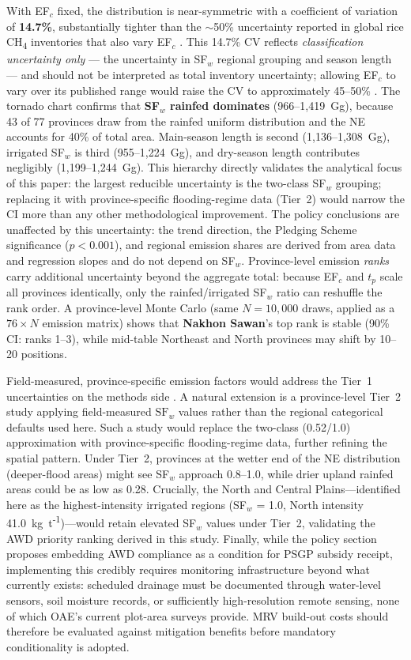 \documentclass[fleqn,10pt]{olplainarticle}
\begin{document}
With EF$_c$ fixed, the distribution is near-symmetric with a coefficient of
variation of \textbf{14.7\%}, substantially tighter than the $\sim$50\% uncertainty
reported in global rice CH\textsubscript{4} inventories that also vary EF$_c$
\citep{yan2009}.
This 14.7\% CV reflects \textit{classification uncertainty only} --- the uncertainty
in SF$_w$ regional grouping and season length --- and should not be interpreted as
total inventory uncertainty; allowing EF$_c$ to vary over its published range
would raise the CV to approximately 45--50\% \citep{yan2009}.
The tornado chart confirms that \textbf{SF$_w$ rainfed dominates}
(966--1,419~Gg), because 43 of 77 provinces draw from the rainfed
uniform distribution and the NE accounts for 40\% of total area.
Main-season length is second (1,136--1,308~Gg), irrigated SF$_w$ is third
(955--1,224~Gg), and dry-season length contributes negligibly (1,199--1,244~Gg).
This hierarchy directly validates the analytical focus of this paper:
the largest reducible uncertainty is the two-class SF$_w$ grouping; replacing it
with province-specific flooding-regime data (Tier~2) would narrow the CI more
than any other methodological improvement.
The policy conclusions are unaffected by this uncertainty: the trend direction,
the Pledging Scheme significance ($p < 0.001$), and regional emission shares
are derived from area data and regression slopes and do not depend on SF$_w$.
Province-level emission \textit{ranks} carry additional uncertainty beyond the
aggregate total: because EF$_c$ and $t_p$ scale all provinces identically, only
the rainfed/irrigated SF$_w$ ratio can reshuffle the rank order.
A province-level Monte Carlo (same $N = 10{,}000$ draws, applied as a $76 \times N$
emission matrix) shows that \textbf{Nakhon Sawan}'s top rank is stable (90\% CI:
ranks 1--3), while mid-table Northeast and North provinces may shift by 10--20
positions.

Field-measured, province-specific emission factors would address the Tier~1
uncertainties on the methods side \citep{wassmann2000, yan2009}.
A natural extension is a province-level Tier~2 study applying
field-measured $\text{SF}_w$ values rather than the regional categorical
defaults used here.
Such a study would replace the two-class (0.52/1.0) approximation with
province-specific flooding-regime data, further refining the spatial pattern.
Under Tier~2, provinces at the wetter end of the NE distribution (deeper-flood
areas) might see SF$_w$ approach 0.8--1.0, while drier upland rainfed areas
could be as low as 0.28.
Crucially, the North and Central Plains---identified here as the highest-intensity
irrigated regions (SF$_w$ = 1.0, North intensity 41.0~kg~t\textsuperscript{-1})---would
retain elevated SF$_w$ values under Tier~2, validating the AWD priority ranking
derived in this study.
Finally, while the policy section proposes embedding AWD compliance as a
condition for PSGP subsidy receipt, implementing this credibly requires
monitoring infrastructure beyond what currently exists: scheduled drainage
must be documented through water-level sensors, soil moisture records, or
sufficiently high-resolution remote sensing, none of which OAE's current
plot-area surveys provide.
MRV build-out costs should therefore be evaluated against mitigation benefits
before mandatory conditionality is adopted.
\end{document}
